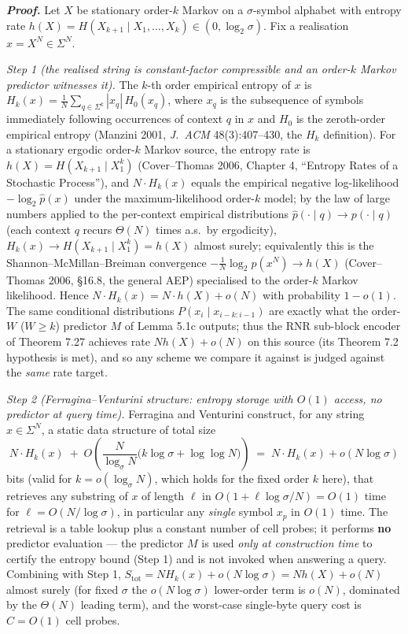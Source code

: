 \documentclass[
]{article}
\begin{document}
\emph{\textbf{Proof.}} Let $X$ be stationary order-$k$ Markov on a
$\sigma$-symbol alphabet with entropy rate $h(X) = H(X_{k+1} \mid
X_1, \ldots, X_k) \in (0, \log_2 \sigma)$. Fix a realisation
$x = X^N \in \Sigma^N$.

\emph{Step 1 (the realised string is constant-factor compressible and an
order-$k$ Markov predictor witnesses it).} The $k$-th order empirical
entropy of $x$ is $H_k(x) = \frac{1}{N} \sum_{q \in \Sigma^k}
|x_q|\, H_0(x_q)$, where $x_q$ is the subsequence of symbols immediately
following occurrences of context $q$ in $x$ and $H_0$ is the zeroth-order
empirical entropy (Manzini 2001, \emph{J.\ ACM} 48(3):407--430, the
$H_k$ definition). For a stationary ergodic order-$k$ Markov source, the
entropy rate is $h(X) = H(X_{k+1} \mid X_1^k)$ (Cover--Thomas 2006,
Chapter 4, ``Entropy Rates of a Stochastic Process''), and $N \cdot
H_k(x)$ equals the empirical negative log-likelihood
$-\log_2 \hat{p}(x)$ under the maximum-likelihood order-$k$ model; by
the law of large numbers applied to the per-context empirical
distributions $\hat{p}(\cdot \mid q) \to p(\cdot \mid q)$ (each context
$q$ recurs $\Theta(N)$ times a.s.\ by ergodicity), $H_k(x) \to
H(X_{k+1}\mid X_1^k) = h(X)$ almost surely; equivalently this is the
Shannon--McMillan--Breiman convergence $-\frac{1}{N}\log_2 p(x^N) \to
h(X)$ (Cover--Thomas 2006, \S16.8, the general AEP) specialised to the
order-$k$ Markov likelihood. Hence $N \cdot H_k(x) = N \cdot h(X) + o(N)$
with probability $1 - o(1)$. The same conditional
distributions $P(x_i \mid x_{i-k:i-1})$ are exactly what the order-$W$
($W \geq k$) predictor $M$ of Lemma 5.1c outputs; thus the RNR sub-block
encoder of Theorem 7.27 achieves rate $N h(X) + o(N)$ on this source
(its Theorem 7.2 hypothesis is met), and so any scheme we compare it
against is judged against the \emph{same} rate target.

\emph{Step 2 (Ferragina--Venturini structure: entropy storage with
$O(1)$ access, no predictor at query time).} Ferragina and Venturini
construct, for any string $x \in \Sigma^N$, a static data structure
of total size
\[
  N \cdot H_k(x) \;+\; O\!\left(\frac{N}{\log_\sigma N}
  \bigl(k \log \sigma + \log\log N\bigr)\right)
  \;=\; N \cdot H_k(x) + o(N \log \sigma)
\]
bits (valid for $k = o(\log_\sigma N)$, which holds for the fixed
order $k$ here), that retrieves any substring of $x$ of length $\ell$ in
$O(1 + \ell \log \sigma / N) = O(1)$ time for $\ell = O(N/\log\sigma)$,
in particular any \emph{single} symbol $x_p$ in $O(1)$ time. The
retrieval is a table lookup plus a constant number of cell probes; it
performs \textbf{no} predictor evaluation --- the predictor $M$ is used
\emph{only at construction time} to certify the entropy bound (Step 1)
and is not invoked when answering a query. Combining with Step 1,
$S_{\mathrm{tot}} = N H_k(x) + o(N\log\sigma) = N h(X) + o(N)$ almost
surely (for fixed $\sigma$ the $o(N\log\sigma)$ lower-order term is
$o(N)$, dominated by the $\Theta(N)$ leading term), and the worst-case
single-byte query cost is $C = O(1)$ cell probes.
\end{document}
